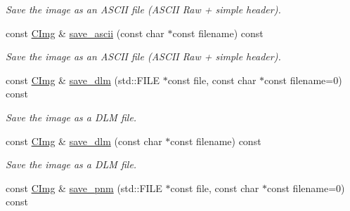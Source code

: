 \begin{DoxyCompactItemize}
\begin{DoxyCompactList}\small\item\em Save the image as an A\-S\-C\-I\-I file (A\-S\-C\-I\-I Raw + simple header). \end{DoxyCompactList}\item 
\hypertarget{structcimg__library_1_1_c_img_a5c4b4bfa11a6c0fe71460d750db05a27}{const \hyperlink{structcimg__library_1_1_c_img}{C\-Img} \& \hyperlink{structcimg__library_1_1_c_img_a5c4b4bfa11a6c0fe71460d750db05a27}{save\-\_\-ascii} (const char $\ast$const filename) const }\label{structcimg__library_1_1_c_img_a5c4b4bfa11a6c0fe71460d750db05a27}

\begin{DoxyCompactList}\small\item\em Save the image as an A\-S\-C\-I\-I file (A\-S\-C\-I\-I Raw + simple header). \end{DoxyCompactList}\item 
\hypertarget{structcimg__library_1_1_c_img_a189616455ee879a3372a13b860bab05c}{const \hyperlink{structcimg__library_1_1_c_img}{C\-Img} \& \hyperlink{structcimg__library_1_1_c_img_a189616455ee879a3372a13b860bab05c}{save\-\_\-dlm} (std\-::\-F\-I\-L\-E $\ast$const file, const char $\ast$const filename=0) const }\label{structcimg__library_1_1_c_img_a189616455ee879a3372a13b860bab05c}

\begin{DoxyCompactList}\small\item\em Save the image as a D\-L\-M file. \end{DoxyCompactList}\item 
\hypertarget{structcimg__library_1_1_c_img_af33668c7503fcf0a797192012b501725}{const \hyperlink{structcimg__library_1_1_c_img}{C\-Img} \& \hyperlink{structcimg__library_1_1_c_img_af33668c7503fcf0a797192012b501725}{save\-\_\-dlm} (const char $\ast$const filename) const }\label{structcimg__library_1_1_c_img_af33668c7503fcf0a797192012b501725}

\begin{DoxyCompactList}\small\item\em Save the image as a D\-L\-M file. \end{DoxyCompactList}\item 
\hypertarget{structcimg__library_1_1_c_img_a5449e3262d461016ac4eb767963a231d}{const \hyperlink{structcimg__library_1_1_c_img}{C\-Img} \& \hyperlink{structcimg__library_1_1_c_img_a5449e3262d461016ac4eb767963a231d}{save\-\_\-pnm} (std\-::\-F\-I\-L\-E $\ast$const file, const char $\ast$const filename=0) const }\label{structcimg__library_1_1_c_img_a5449e3262d461016ac4eb767963a231d}


\end{DoxyCompactItemize}
